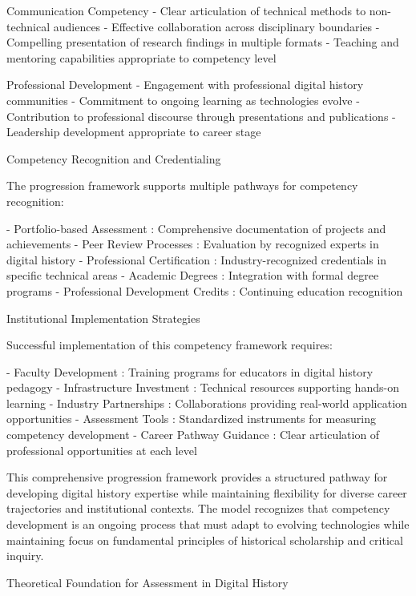\begin{appendices}
      Communication Competency 
- Clear articulation of technical methods to non-technical audiences
- Effective collaboration across disciplinary boundaries
- Compelling presentation of research findings in multiple formats
- Teaching and mentoring capabilities appropriate to competency level

      Professional Development 
- Engagement with professional digital history communities
- Commitment to ongoing learning as technologies evolve
- Contribution to professional discourse through presentations and publications
- Leadership development appropriate to career stage

    Competency Recognition and Credentialing

The progression framework supports multiple pathways for competency recognition:

-  Portfolio-based Assessment : Comprehensive documentation of projects and achievements
-  Peer Review Processes : Evaluation by recognized experts in digital history
-  Professional Certification : Industry-recognized credentials in specific technical areas
-  Academic Degrees : Integration with formal degree programs
-  Professional Development Credits : Continuing education recognition

    Institutional Implementation Strategies

Successful implementation of this competency framework requires:

-  Faculty Development : Training programs for educators in digital history pedagogy
-  Infrastructure Investment : Technical resources supporting hands-on learning
-  Industry Partnerships : Collaborations providing real-world application opportunities
-  Assessment Tools : Standardized instruments for measuring competency development
-  Career Pathway Guidance : Clear articulation of professional opportunities at each level

This comprehensive progression framework provides a structured pathway for developing digital history expertise while maintaining flexibility for diverse career trajectories and institutional contexts. The model recognizes that competency development is an ongoing process that must adapt to evolving technologies while maintaining focus on fundamental principles of historical scholarship and critical inquiry.

\label{ass_tool}
Theoretical Foundation for Assessment in Digital History


\end{appendices}
